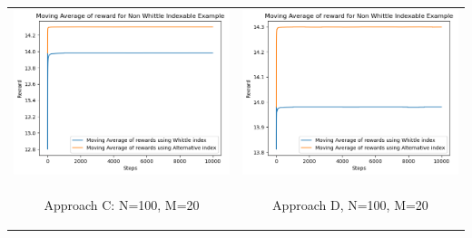 \documentclass{slides}
\begin{document}
{{\begin{center}
\begin{tabular}{cc}
\includegraphics[scale=0.6]{BTP_non_whittle_indexable_C.png} &
\includegraphics[scale=0.6]{BTP_non_whittle_indexable_D.png} \\
\begin{small}
 Approach C: N=100, M=20\end{small} & \begin{small}Approach D, N=100, M=20\end{small}\\
 \end{tabular}


\end{center}}}
\end{document}
